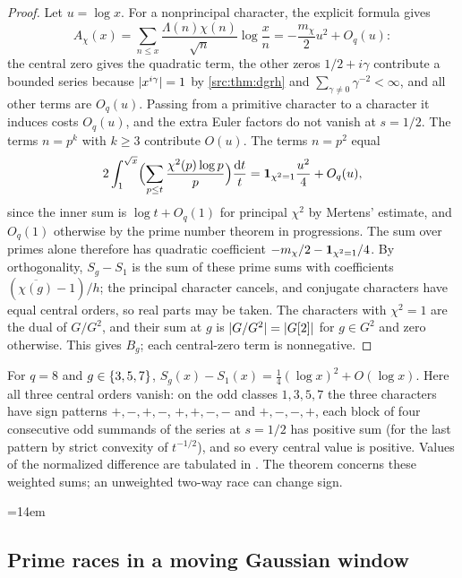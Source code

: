\begin{proof}
Let $u=\log x$. For a nonprincipal character, the explicit formula \cite[(62), (64)]{Suzuki2025Variants}
gives
\[
 A_\chi(x)=\sum_{n\le x}\frac{\Lambda(n)\chi(n)}{\sqrt n}\log\frac xn=-\frac{m_\chi}2u^2+O_q(u):
\]
the central zero gives the quadratic term, the other zeros $1/2+i\gamma$ contribute a bounded series
because $\lvert x^{i\gamma}\rvert=1$ by \cref{src:thm:dgrh} and $\sum_{\gamma\ne0}\gamma^{-2}<\infty$, and all
other terms are $O_q(u)$. Passing from a primitive character to a character it induces costs $O_q(u)$, and
the extra Euler factors do not vanish at $s=1/2$. The terms $n=p^k$ with $k\ge3$ contribute $O(u)$. The
terms $n=p^2$ equal
\[
 2\int_1^{\sqrt x}\Bigl(\sum_{p\le t}\frac{\chi^2(p)\log p}p\Bigr)\frac{\mathrm{d} t}t
 =\mathbf{1}_{\chi^2=1}\frac{u^2}4+O_q(u),
\]
since the inner sum is $\log t+O_q(1)$ for principal $\chi^2$ by Mertens' estimate, and $O_q(1)$ otherwise
by the prime number theorem in progressions. The sum over primes alone therefore has quadratic coefficient
$-m_\chi/2-\mathbf{1}_{\chi^2=1}/4$. By orthogonality, $S_g-S_1$ is the sum of these prime sums with
coefficients $(\overline{\chi(g)}-1)/h$; the principal character cancels, and conjugate characters have
equal central orders, so real parts may be taken. The characters with $\chi^2=1$ are the dual of $G/G^2$,
and their sum at $g$ is $\lvert G/G^2\rvert=\lvert G[2]\rvert$ for $g\in G^2$ and zero otherwise. This gives $B_g$; each
central-zero term is nonnegative.
\end{proof}

\begin{example}\label{hec:ex:mod8}
For $q=8$ and $g\in\{3,5,7\}$, $S_g(x)-S_1(x)=\tfrac14(\log x)^2+O(\log x)$. Here all three central orders
vanish: on the odd classes $1,3,5,7$ the three characters have sign patterns $+,-,+,-$, $+,+,-,-$ and
$+,-,-,+$, each block of four consecutive odd summands of the series at $s=1/2$ has positive sum (for the
last pattern by strict convexity of $t^{-1/2}$), and so every central value is positive. Values of the
normalized difference are tabulated in . The theorem
concerns these weighted sums; an unweighted two-way race can change sign.
{\emergencystretch=14em\par}
\end{example}

\subsection{Prime races in a moving Gaussian window}\label{zer:sec:gauss}

